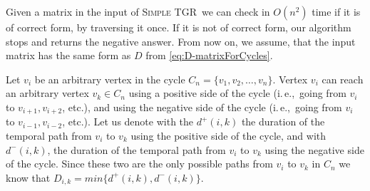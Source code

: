 \documentclass[11pt,a4paper]{article}
\theoremstyle{remark}
\theoremstyle{definition}
\newcommand{\ie}{i.\,e.,\ }
\newcommand{\deltaExact}{\textsc{Simple TGR}}
\begin{document}
Given a matrix in the input of \deltaExact\ we can check in $O(n^2)$ time if it is of correct form, by traversing it once. If it is not of correct form, our algorithm stops and returns the negative answer.
From now on, we assume, that the input matrix has the same form as $D$ from \cref{eq:D-matrixForCycles}.

Let $v_i$ be an arbitrary vertex in the cycle $C_n =\{v_1, v_2, \dots, v_n\}$.
Vertex $v_i$ can reach an arbitrary vertex $v_k \in C_n$ using a positive side of the cycle (\ie going from $v_i$ to $v_{i+1},  v_{i+2}$, etc.), 
and using the negative side of the cycle (\ie going from $v_i$ to $v_{i-1}, v_{i-2}$, etc.).
Let us denote with the $d^+(i,k)$ the duration of the temporal path from $v_i$ to $v_k$ using the positive side of the cycle,
and with $d^-(i,k)$, the duration of the temporal path from $v_i$ to $v_k$ using the negative side of the cycle.
Since these two are the only possible paths from $v_i$ to $v_k$ in $C_n$ we know that $D_{i,k} = min \{d^+(i,k), d^-(i,k)\}$.
\end{document}
